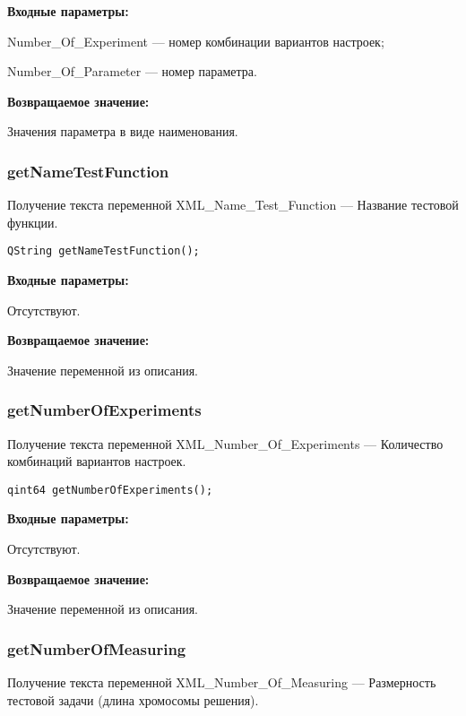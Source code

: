 \textbf{Входные параметры:}

Number\_Of\_Experiment --- номер комбинации вариантов настроек;
 
Number\_Of\_Parameter --- номер параметра.

\textbf{Возвращаемое значение:}

Значения параметра в виде наименования.


\subsubsection{getNameTestFunction}\label{getNameTestFunction}

Получение текста переменной  XML\_Name\_Test\_Function --- Название тестовой функции.


\begin{lstlisting}[label=code_syntax_getNameTestFunction,caption=Синтаксис]
QString getNameTestFunction();
\end{lstlisting}

\textbf{Входные параметры:}

Отсутствуют.

\textbf{Возвращаемое значение:}

Значение переменной из описания.


\subsubsection{getNumberOfExperiments}\label{getNumberOfExperiments}

Получение текста переменной  XML\_Number\_Of\_Experiments --- Количество комбинаций вариантов настроек.


\begin{lstlisting}[label=code_syntax_getNumberOfExperiments,caption=Синтаксис]
qint64 getNumberOfExperiments();
\end{lstlisting}

\textbf{Входные параметры:}

Отсутствуют.

\textbf{Возвращаемое значение:}

Значение переменной из описания.


\subsubsection{getNumberOfMeasuring}\label{getNumberOfMeasuring}

Получение текста переменной  XML\_Number\_Of\_Measuring --- Размерность тестовой задачи (длина хромосомы решения).


